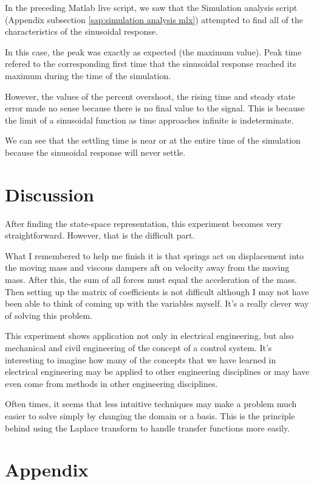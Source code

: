 \documentclass[12pt]{article}
\begin{document}
In the preceding Matlab live script,
we saw that
the Simulation analysis script (Appendix subsection \ref{sap:simulation analysis mlx})
attempted to find all of the characteristics of the sinusoidal response.

In this case, the peak was exactly as expected (the maximum value).
Peak time refered to the corresponding first time that the sinusoidal response reached its maximum
during the time of the simulation.

However, the values of the percent overshoot, the rising time and steady state error made no sense because there is no final value to the signal.
This is because the limit of a sinusoidal function as time approaches infinite is indeterminate.

We can see that the settling time is near or at the entire time of the simulation because the sinusoidal response will never settle.

\section{Discussion}

After finding the state-space representation,
this experiment becomes very straightforward.
However, that is the difficult part.

What I remembered to help me finish it is that springs act on displacement into the moving mass and viscous dampers aft on velocity away from the moving mass.
After this, the sum of all forces must equal the acceleration of the mass.
Then setting up the matrix of coefficients is not difficult although I may not have been able to think of coming up with the variables myself.
It's a really clever way of solving this problem.

This experiment shows application not only in electrical engineering, but also mechanical and civil engineering of the concept of a control system.
It's interesting to imagine how many of the concepts that we have learned in electrical engineering may be applied to other engineering disciplines or may have even come from methods in other engineering disciplines.

Often times, it seems that less intuitive techniques may make a problem much easier to solve simply by changing the domain or a basis.
This is the principle behind using the Laplace transform to handle transfer functions more easily.

\newpage
\appendix
\section{Appendix}
\end{document}
